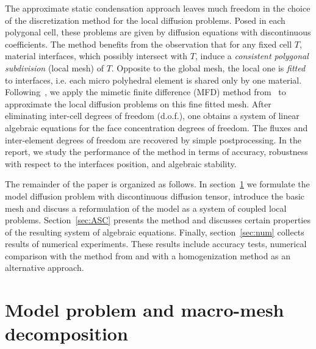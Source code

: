 \documentclass[12pt]{article}
\begin{document}
	The approximate static condensation approach leaves much freedom in the choice of the discretization method for the local diffusion problems.  Posed in each polygonal cell, these problems are given by  diffusion equations with  discontinuous coefficients. The method benefits from the observation that   for any fixed cell $T$,  material interfaces, which possibly intersect with $T$,  induce a \emph{consistent polygonal subdivision} (local mesh) of $T$. Opposite to the global mesh, the local one is \emph{fitted} to interfaces, i.e. each micro polyhedral element is shared only by one material. Following~\cite{kikinzon2017approximate}, we apply the mimetic finite difference (MFD) method from~\cite{lipnikov2014mimetic} to approximate the local diffusion problems on this fine fitted mesh.
	After eliminating inter-cell degrees of freedom (d.o.f.), one obtains a system of linear algebraic equations for the face concentration degrees of freedom. The fluxes and inter-element degrees of freedom are recovered by simple postprocessing. In the report, we study the performance of the method in terms of accuracy, robustness with respect to the interfaces position,  and algebraic stability.
	
	The remainder of the paper is organized as follows. In section~\ref{sec:model} we formulate the model diffusion problem with discontinuous diffusion tensor, introduce the basic mesh and discuss a reformulation of the model as a system of coupled local problems. Section~\ref{sec:ASC} presents the method and discusses certain  properties of the resulting  system of algebraic equations. Finally, section~\ref{sec:num} collects results of numerical experiments. These results include accuracy tests, numerical comparison with the method from  \cite{kikinzon2017approximate} and with a homogenization method as an alternative approach.
	
	\section{Model problem and macro-mesh decomposition} \label{sec:model}
	
\end{document}
